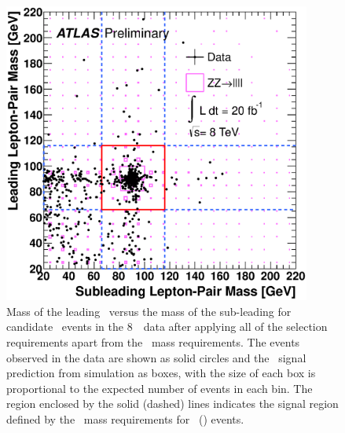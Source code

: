  \begin{figure}[htbp]
 \begin{center}
  \includegraphics[width=0.9\textwidth]{8TeV/h_mz1_mz2}\hfill
  \caption[Mass of the leading \leppair\ versus the mass of the
  sub-leading \leppair\ for candidate \ZZ\ events in the 8~\tev\ data, after applying all of the selection
  requirements apart from the \dilepton\ mass requirements.]
  {\small Mass of the leading \leppair\ versus the mass of the
  sub-leading \leppair for candidate \ZZ\ events in the 8~\tev\ data after
  applying all of the selection
  requirements apart from the \dilepton\ mass requirements.
  The events observed in the data are shown as solid circles and the \ZZsllll\
  signal prediction from simulation as boxes, with 
  the size of each box is proportional to the expected number of events in each bin.  
  The region enclosed by the solid (dashed) lines indicates the signal region defined by the
  \dilepton\ mass requirements for \ZZ\ (\ZZs) events.
   }
    \label{fig:zzdists-Zmass2D-eight}
 \end{center}
 \end{figure}

